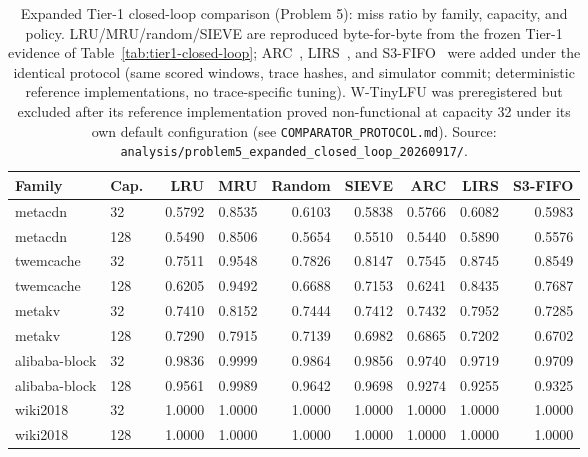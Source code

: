 \begin{table}[t]
  \centering
  \footnotesize
  \caption{Expanded Tier-1 closed-loop comparison (Problem 5): miss ratio by
  family, capacity, and policy. LRU/MRU/random/SIEVE are reproduced
  byte-for-byte from the frozen Tier-1 evidence of
  Table~\ref{tab:tier1-closed-loop}; ARC~\cite{megiddo2003arc},
  LIRS~\cite{jiang2002lirs}, and S3-FIFO~\cite{yang2023s3fifo} were added
  under the identical protocol (same scored windows, trace hashes, and
  simulator commit; deterministic reference implementations, no
  trace-specific tuning). W-TinyLFU was preregistered but excluded after its
  reference implementation proved non-functional at capacity 32 under its own
  default configuration (see \texttt{COMPARATOR\_PROTOCOL.md}). Source:
  \texttt{analysis/problem5\_expanded\_closed\_loop\_20260917/}.}
  \label{tab:expanded-closed-loop}
  \begin{tabularx}{\columnwidth}{@{}llrrrrrrr@{}}
    \toprule
    Family & Cap.\ & LRU & MRU & Random & SIEVE & ARC & LIRS & S3-FIFO \\
    \midrule
    metacdn      & 32  & 0.5792 & 0.8535 & 0.6103 & 0.5838 & 0.5766 & 0.6082 & 0.5983 \\
    metacdn      & 128 & 0.5490 & 0.8506 & 0.5654 & 0.5510 & 0.5440 & 0.5890 & 0.5576 \\
    twemcache    & 32  & 0.7511 & 0.9548 & 0.7826 & 0.8147 & 0.7545 & 0.8745 & 0.8549 \\
    twemcache    & 128 & 0.6205 & 0.9492 & 0.6688 & 0.7153 & 0.6241 & 0.8435 & 0.7687 \\
    metakv       & 32  & 0.7410 & 0.8152 & 0.7444 & 0.7412 & 0.7432 & 0.7952 & 0.7285 \\
    metakv       & 128 & 0.7290 & 0.7915 & 0.7139 & 0.6982 & 0.6865 & 0.7202 & 0.6702 \\
    alibaba-block & 32 & 0.9836 & 0.9999 & 0.9864 & 0.9856 & 0.9740 & 0.9719 & 0.9709 \\
    alibaba-block & 128 & 0.9561 & 0.9989 & 0.9642 & 0.9698 & 0.9274 & 0.9255 & 0.9325 \\
    wiki2018     & 32  & 1.0000 & 1.0000 & 1.0000 & 1.0000 & 1.0000 & 1.0000 & 1.0000 \\
    wiki2018     & 128 & 1.0000 & 1.0000 & 1.0000 & 1.0000 & 1.0000 & 1.0000 & 1.0000 \\
    \bottomrule
  \end{tabularx}
\end{table}
